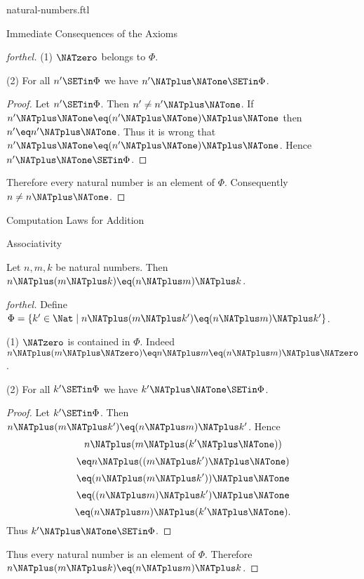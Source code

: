 \documentclass{stex}
\begin{document}
\begin{smodule}{natural-numbers.ftl}
\begin{sfragment}{Immediate Consequences of the Axioms}
\begin{proof}[forthel]
    (1) $\NATzero$ belongs to $\Phi$.

    (2) For all $n' \SETin \Phi$ we have $n' \NATplus \NATone \SETin \Phi$.
    \begin{proof}
      Let $n' \SETin \Phi$.
      Then $n' \neq n' \NATplus \NATone$.
      If $n' \NATplus \NATone \eq (n' \NATplus \NATone) \NATplus \NATone$ then $n' \eq n' \NATplus \NATone$.
      Thus it is wrong that $n' \NATplus \NATone \eq (n' \NATplus \NATone) \NATplus \NATone$.
      Hence $n' \NATplus \NATone \SETin \Phi$.
    \end{proof}

    Therefore every natural number is an element of $\Phi$.
    Consequently $n \neq n \NATplus \NATone$.
  \end{proof}
\end{sfragment}

\begin{sfragment}{Computation Laws for Addition}
  \begin{sfragment}{Associativity}
    \begin{proposition}[forthel,id=ARITHMETIC_03_3235893452210176]
      Let $n, m, k$ be natural numbers.
      Then $n \NATplus (m \NATplus k) \eq (n \NATplus m) \NATplus k$.
    \end{proposition}
    \begin{proof}[forthel]
      Define $\Phi = \{ k' \in \Nat \mid n \NATplus (m \NATplus k') \eq (n \NATplus m) \NATplus k' \}$.

      (1) $\NATzero$ is contained in $\Phi$.
      Indeed $n \NATplus (m \NATplus \NATzero) \eq n \NATplus m \eq (n \NATplus m) \NATplus \NATzero$.

      (2) For all $k' \SETin \Phi$ we have $k' \NATplus \NATone \SETin \Phi$.
      \begin{proof}
        Let $k' \SETin \Phi$.
        Then $n \NATplus (m \NATplus k') \eq (n \NATplus m) \NATplus k'$.
        Hence
        \[  n \NATplus (m \NATplus (k' \NATplus \NATone))        \]
        \[    \eq n \NATplus ((m \NATplus k') \NATplus \NATone)    \]
        \[    \eq (n \NATplus (m \NATplus k')) \NATplus \NATone    \]
        \[    \eq ((n \NATplus m) \NATplus k') \NATplus \NATone    \]
        \[    \eq (n \NATplus m) \NATplus (k' \NATplus \NATone).   \]
        Thus $k' \NATplus \NATone \SETin \Phi$.
      \end{proof}

      Thus every natural number is an element of $\Phi$.
      Therefore $n \NATplus (m \NATplus k) \eq (n \NATplus m) \NATplus k$.
    \end{proof}
  \end{sfragment}


\end{sfragment}
\end{smodule}
\end{document}
